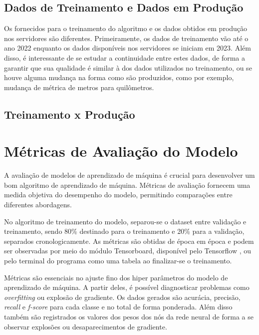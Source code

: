 \subsection{Dados de Treinamento e Dados em Produção}
Os fornecidos para o treinamento do algoritmo e os dados obtidos em produção nos servidores são diferentes. Primeiramente, os dados de treinamento vão até o ano 2022 enquanto os dados disponíveis nos servidores se iniciam em 2023. Além disso, é interessante de se estudar a continuidade entre estes dados, de forma a garantir que sua qualidade é similar à dos dados utilizados no treinamento, ou se houve alguma mudança na forma como são produzidos, como por exemplo, mudança de métrica de metros para quilômetros.


\subsection{Treinamento x Produção}
\subsection{}

\section{Métricas de Avaliação do Modelo}

A avaliação de modelos de aprendizado de máquina é crucial para desenvolver um bom algoritmo de aprendizado de máquina. Métricas de avaliação fornecem uma medida objetiva do desempenho do modelo, permitindo comparações entre diferentes abordagens.

No algoritmo de treinamento do modelo, separou-se o dataset entre validação e treinamento, sendo 80\% destinado para o treinamento e 20\% para a validação, separados cronologicamente. As métricas são obtidas de época em época e podem ser observadas por meio do módulo Tensorboard, disponível pelo Tensorflow \cite{tensorflow2015-whitepaper}, ou pelo terminal do programa como uma tabela ao finalizar-se o treinamento.

Métricas são essenciais no ajuste fino dos hiper parâmetros do modelo de aprendizado de máquina. A partir deles, é possível diagnosticar problemas como \textit{overfitting} ou explosão de gradiente. Os dados gerados são acurácia, precisão, \textit{recall} e \textit{f-score} para cada classe e no total de forma ponderada. Além disso também são registrados os valores dos pesos dos nós da rede neural de forma a se observar explosões ou desaparecimentos de gradiente.

